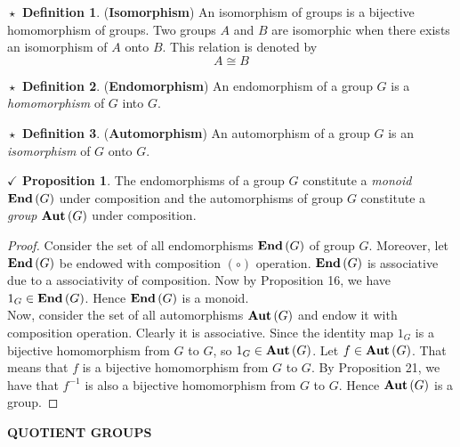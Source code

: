 \documentclass{article}
\theoremstyle{definition}
\newtheorem{definition}{$\boxed{\star}$ Definition}
\theoremstyle{remark}
\theoremstyle{definition}
\theoremstyle{definition}
\newtheorem{proposition}{$\checkmark$ Proposition}
\theoremstyle{definition}
\theoremstyle{proof}
\newcommand{\inv}[1]{#1^{-1}}
\newcommand{\End}[1]{\text{\textbf{End}}\left(#1\right)}
\newcommand{\Auto}[1]{\text{\textbf{Aut}}\left(#1\right)}
\begin{document}
\hrulefill
\begin{definition}
	(\textbf{Isomorphism}) An isomorphism of groups is a bijective homomorphism of groups. Two groups $ A $ and $ B $ are isomorphic when there exists an isomorphism of $ A $ onto $ B $. This relation is denoted by
	\[A \cong B\]
\end{definition}
\hrulefill
\begin{definition}
	(\textbf{Endomorphism}) An endomorphism of a group $ G $ is a \emph{homomorphism} of $ G $ into $ G $.
\end{definition}
\begin{definition}
	(\textbf{Automorphism}) An automorphism of a group $ G $ is an \emph{isomorphism} of $ G $ onto $ G $.
\end{definition}
\hrulefill
\begin{proposition}
	The endomorphisms of a group $ G $ constitute a \emph{monoid} $ \End{G} $ under composition and the automorphisms of group $ G $ constitute a \emph{group} $ \Auto{G} $ under composition.
\end{proposition}
\begin{proof}
	Consider the set of all endomorphisms $ \End{G} $ of group $ G $. Moreover, let $ \End{G} $ be endowed with composition $ (\circ) $ operation. $ \End{G} $ is associative due to a associativity of composition. Now by Proposition 16, we have $ 1_G \in \End{G} $. Hence $ \End{G} $ is a monoid.\\
	Now, consider the set of all automorphisms $ \Auto{G} $ and endow it with composition operation. Clearly it is associative. Since the identity map $ 1_G $ is a bijective homomorphism from $ G $ to $ G $, so $ 1_G\in \Auto{G} $. Let $ f\in \Auto{G} $. That means that $ f $ is a bijective homomorphism from $ G $ to $ G $. By Proposition 21, we have that $ \inv{f} $ is also a bijective homomorphism from $ G $ to $ G $. Hence $ \Auto{G} $ is a group.
\end{proof}
\hrulefill
\textbf{QUOTIENT GROUPS}
\hrulefill
\end{document}
